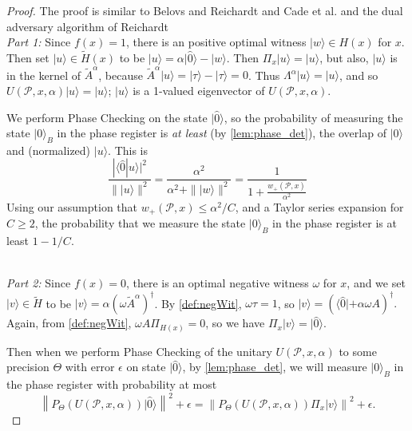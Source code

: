 \documentclass[cleveref, autoref, thm-restate,11pt]{article}
\theoremstyle{definition}
\newcommand{\sop}[1]{{\mathcal #1}}
\newcommand{\ket}[1]{|#1\rangle}
\newcommand{\bra}[1]{\langle#1|}
\newcommand{\braket}[2]{\langle{#1}|{#2}\rangle}
\newcommand{\Lal}[1]{{\Lambda^{\!{#1}}}}
\newcommand{\U}[3]{{U({#1},{#2},{#3})}}
\renewcommand{\wp}[2]{{w_+({#1},{#2})}}
\newcommand{\Aa}[1]{{\tilde{A}^{#1}}}
\newcommand{\PtHx}{\Pi_{x}}
\newcommand{\PHx}{\Pi_{{H}(x)}}
\begin{document}
\begin{proof}
The proof is similar to Belovs and Reichardt \cite[Section
5.2]{belovsSpanProgramsQuantum2012} and Cade et al. \cite[Section
C.2]{cadeTimeSpaceEfficient2018} and the dual adversary algorithm of Reichardt
\cite[Algorithm 1]{reichardtReflectionsQuantumQuery2011}
~\\
\textit{Part 1:} Since $f(x)=1$, there is an positive optimal witness $\ket{w}\in H(x)$
for $x$. Then set $\ket{u}\in \tilde{H}(x)$ to be
$\ket{u}=\alpha\ket{\hat{0}}-\ket{w}.$ Then $\Pi_x\ket{u}=\ket{u}$, but also,
$\ket{u}$ is in the kernel of $\Aa{\alpha}$, because
$\Aa{\alpha}\ket{u}=\ket{\tau}-\ket{\tau}=0$.
Thus $\Lal{\alpha}\ket{u}=\ket{u}$, and so $\U{\sop P}{x}{
\alpha}\ket{u}=\ket{u}$; $\ket{u}$ is a 1-valued eigenvector of 
$\U{\sop P}{x}{\alpha}$.

We perform Phase Checking on the state
$\ket{\hat{0}}$, so the probability of measuring the state $\ket{0}_B$ in the phase register is \textit{at least} (by \cref{lem:phase_det}), the
overlap of $\ket{\hat{0}}$ and (normalized) $\ket{u}$. This is
\begin{equation}
\frac{|\braket{\hat{0}}{u}|^{2}}{\| \ket{u} \|^2} = \frac{\alpha^2}{\alpha^2+\|\ket{w}\|^2}=\frac{1}{1+\frac{\wp{\sop P}{x}}{\alpha^2}}
\end{equation}
Using our assumption that $\wp{\sop P}{x}\leq \alpha^2/C$, and a Taylor
series expansion for $C\geq 2$, the probability that we measure the state $\ket{0}_B$ in the phase register is at least $1-1/C$.


~\\ \textit{Part 2:} Since $f(x)=0$, there is an optimal negative witness
$\omega$ for $x$, and we set $\ket{v}\in \tilde{H}$ to be $\ket{v}=\alpha 
(\omega\Aa{\alpha})^\dagger$. By \cref{def:negWit}, $\omega\tau=1$, so $\ket{v}=(\bra{\hat{0}}+\alpha\omega A)^\dagger.$ Again, from \cref{def:negWit},
$\omega A \PHx=0$, so we have $\Pi_x\ket{v}=\ket{\hat{0}}.$


Then when we perform Phase Checking of the unitary $\U{\sop P}{x}{\alpha}$ to some
precision $\Theta$ with error $\epsilon$ on state $\ket{\hat{0}}$, by
\cref{lem:phase_det}, we will measure $\ket{0}_B$ in the phase register with probability at most
\begin{equation}\label{eq:Pbound}
\left\|P_{\Theta}(\U{\sop P}{x}{\alpha})\ket{\hat{0}}\right\|^2+\epsilon=\left\|P_{\Theta}(\U{\sop P}{x}{\alpha})\PtHx\ket{v}\right\|^2+\epsilon.
\end{equation}


\end{proof}
\end{document}
